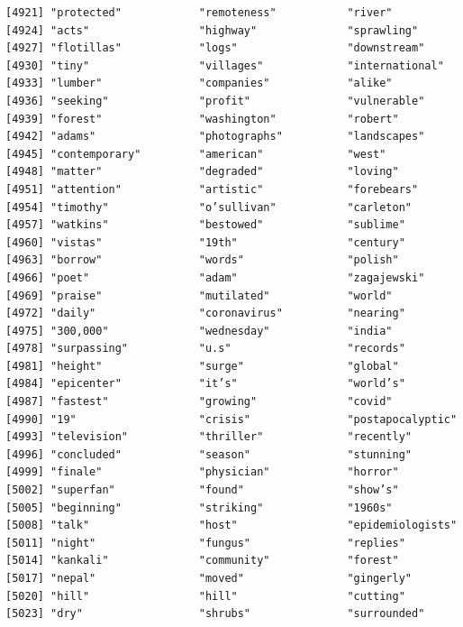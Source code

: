 \documentclass[
  letterpaper,
  DIV=11,
  numbers=noendperiod]{scrartcl}
\begin{document}
\begin{verbatim}
[4921] "protected"            "remoteness"           "river"               
[4924] "acts"                 "highway"              "sprawling"           
[4927] "flotillas"            "logs"                 "downstream"          
[4930] "tiny"                 "villages"             "international"       
[4933] "lumber"               "companies"            "alike"               
[4936] "seeking"              "profit"               "vulnerable"          
[4939] "forest"               "washington"           "robert"              
[4942] "adams"                "photographs"          "landscapes"          
[4945] "contemporary"         "american"             "west"                
[4948] "matter"               "degraded"             "loving"              
[4951] "attention"            "artistic"             "forebears"           
[4954] "timothy"              "o’sullivan"           "carleton"            
[4957] "watkins"              "bestowed"             "sublime"             
[4960] "vistas"               "19th"                 "century"             
[4963] "borrow"               "words"                "polish"              
[4966] "poet"                 "adam"                 "zagajewski"          
[4969] "praise"               "mutilated"            "world"               
[4972] "daily"                "coronavirus"          "nearing"             
[4975] "300,000"              "wednesday"            "india"               
[4978] "surpassing"           "u.s"                  "records"             
[4981] "height"               "surge"                "global"              
[4984] "epicenter"            "it’s"                 "world’s"             
[4987] "fastest"              "growing"              "covid"               
[4990] "19"                   "crisis"               "postapocalyptic"     
[4993] "television"           "thriller"             "recently"            
[4996] "concluded"            "season"               "stunning"            
[4999] "finale"               "physician"            "horror"              
[5002] "superfan"             "found"                "show’s"              
[5005] "beginning"            "striking"             "1960s"               
[5008] "talk"                 "host"                 "epidemiologists"     
[5011] "night"                "fungus"               "replies"             
[5014] "kankali"              "community"            "forest"              
[5017] "nepal"                "moved"                "gingerly"            
[5020] "hill"                 "hill"                 "cutting"             
[5023] "dry"                  "shrubs"               "surrounded"          

\end{verbatim}
\end{document}
